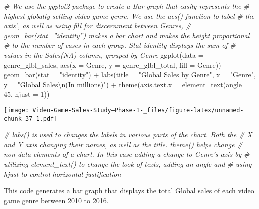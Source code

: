 \documentclass[
]{article}
\newenvironment{Shaded}{\begin{snugshade}}{\end{snugshade}}
\newcommand{\AttributeTok}[1]{\textcolor[rgb]{0.77,0.63,0.00}{#1}}
\newcommand{\CommentTok}[1]{\textcolor[rgb]{0.56,0.35,0.01}{\textit{#1}}}
\newcommand{\DecValTok}[1]{\textcolor[rgb]{0.00,0.00,0.81}{#1}}
\newcommand{\FunctionTok}[1]{\textcolor[rgb]{0.00,0.00,0.00}{#1}}
\newcommand{\NormalTok}[1]{#1}
\newcommand{\SpecialCharTok}[1]{\textcolor[rgb]{0.00,0.00,0.00}{#1}}
\newcommand{\StringTok}[1]{\textcolor[rgb]{0.31,0.60,0.02}{#1}}
\begin{document}
\begin{Shaded}
\begin{Highlighting}[]
\CommentTok{\# We use the ggplot2 package to create a Bar graph that easily represents the}
\CommentTok{\# highest globally selling video game genre. We use the aes() function to label}
\CommentTok{\# the axis’, as well as using fill for discernment between Genres,}
\CommentTok{\# geom\_bar(stat=”identity”) makes a bar chart and makes the height proportional}
\CommentTok{\# to the number of cases in each group. Stat identity displays the sum of}
\CommentTok{\# values in the Sales(NA) column, grouped by Genre}
\FunctionTok{ggplot}\NormalTok{(}\AttributeTok{data =}\NormalTok{ genre\_glbl\_sales, }\FunctionTok{aes}\NormalTok{(}\AttributeTok{x =}\NormalTok{ Genre, }\AttributeTok{y =}\NormalTok{ genre\_glbl\_total, }\AttributeTok{fill =}\NormalTok{ Genre)) }\SpecialCharTok{+}
    \FunctionTok{geom\_bar}\NormalTok{(}\AttributeTok{stat =} \StringTok{"identity"}\NormalTok{) }\SpecialCharTok{+} \FunctionTok{labs}\NormalTok{(}\AttributeTok{title =} \StringTok{"Global Sales by Genre"}\NormalTok{, }\AttributeTok{x =} \StringTok{"Genre"}\NormalTok{,}
    \AttributeTok{y =} \StringTok{"Global Sales}\SpecialCharTok{\textbackslash{}n}\StringTok{(In millions)"}\NormalTok{) }\SpecialCharTok{+} \FunctionTok{theme}\NormalTok{(}\AttributeTok{axis.text.x =} \FunctionTok{element\_text}\NormalTok{(}\AttributeTok{angle =} \DecValTok{45}\NormalTok{,}
    \AttributeTok{hjust =} \DecValTok{1}\NormalTok{))}
\end{Highlighting}
\end{Shaded}

\texttt{[image: Video-Game-Sales-Study--Phase-1-\_files/figure-latex/unnamed-chunk-37-1.pdf]}

\begin{Shaded}
\begin{Highlighting}[]
\CommentTok{\# labs() is used to changes the labels in various parts of the chart. Both the}
\CommentTok{\# X and Y axis changing their names, as well as the title. theme() helps change}
\CommentTok{\# non{-}data elements of a chart. In this case adding a change to Genre’s axis by}
\CommentTok{\# utilizing element\_text() to change the look of texts, adding an angle and}
\CommentTok{\# using hjust to control horizontal justification}
\end{Highlighting}
\end{Shaded}

This code generates a bar graph that displays the total Global sales of
each video game genre between 2010 to 2016.
\end{document}
